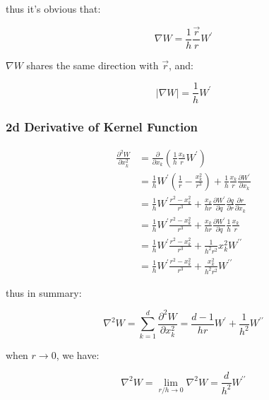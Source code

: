 \documentclass[10pt, oneside]{article}
\begin{document}
thus it's obvious that:

\begin{equation}
    \nabla W = \frac{1}{h}\frac{\vec{r}}{r}W^\prime
\end{equation}

$\nabla W$ shares the same direction with $\vec{r}$, and:

\begin{equation}
    |\nabla W| = \frac{1}{h}W^\prime
\end{equation}

\subsubsection{2d Derivative of Kernel Function}

\begin{equation}
    \begin{aligned}
        \frac{\partial^2 W}{\partial x_k^2} &= \frac{\partial}{\partial x_k}\left(
            \frac{1}{h}\frac{x_k}{r}W^\prime
        \right)\\
        &= \frac{1}{h}W^\prime \left(
            \frac{1}{r} - \frac{x_k^2}{r^3}
        \right)+
        \frac{1}{h}\frac{x_k}{r}\frac{\partial W^\prime}{\partial x_k}\\
        &= \frac{1}{h}W^\prime \frac{r^2-x_k^2}{r^3}+
        \frac{x_k}{hr} \frac{\partial W^\prime}{\partial q}\frac{\partial q}{\partial r}\frac{\partial r}{\partial x_k}\\
        &= \frac{1}{h}W^\prime \frac{r^2-x_k^2}{r^3}+
        \frac{x_k}{hr} \frac{\partial W^\prime}{\partial q}\frac{1}{h}\frac{x_k}{r}\\
        &= \frac{1}{h}W^\prime \frac{r^2-x_k^2}{r^3}+
        \frac{1}{h^2r^2}x_k^2 W^{\prime\prime}\\
        &= \frac{1}{h}W^\prime \frac{r^2-x_k^2}{r^3}+
        \frac{x_k^2}{h^2r^2} W^{\prime\prime}
    \end{aligned}
\end{equation}

thus in summary:

\begin{equation}
    \nabla^2 W = \sum_{k=1}^d \frac{\partial^2 W}{\partial x_k^2} = 
        \frac{d-1}{hr}W^\prime + \frac{1}{h^2}W^{\prime\prime}
\end{equation}

when $r\to 0$, we have:

\begin{equation}
    \nabla^2 W = \lim_{r/h\to 0} \nabla^2 W = \frac{d}{h^2}W^{\prime\prime}
\end{equation}
\end{document}
